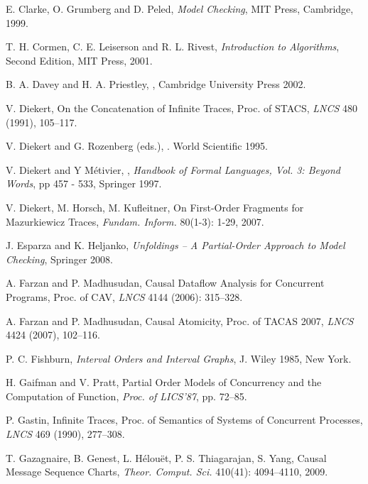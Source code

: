\documentclass{llncs}
\begin{document}
\begin{thebibliography}{19}




E. Clarke, O. Grumberg and D. Peled,  {\em Model Checking}, MIT Press, Cambridge, 1999.

T. H. Cormen, C. E. Leiserson and R. L. Rivest, \emph{Introduction
to Algorithms}, Second Edition, MIT Press, 2001.



B. A. Davey and H. A. Priestley, , \newblock Cambridge University Press 2002.





V. Diekert, On the Concatenation of Infinite Traces, Proc. of STACS, \emph{LNCS} 480 (1991), 105--117.


V. Diekert and G. Rozenberg (eds.),
.
\newblock World Scientific 1995.

V. Diekert and Y M\'etivier,
, {\em Handbook of Formal Languages, Vol. 3: Beyond Words},  pp 457 - 533, Springer 1997. 

V. Diekert, M. Horsch, M. Kufleitner, On First-Order Fragments for Mazurkiewicz Traces, \emph{Fundam. Inform.} 80(1-3): 1-29, 2007.


J. Esparza and K. Heljanko,
\emph{Unfoldings -- A Partial-Order Approach to Model Checking},
Springer 2008. 

A. Farzan and  P. Madhusudan,   Causal Dataflow Analysis for Concurrent Programs,  Proc. of  CAV, {\em LNCS} 4144 (2006): 315--328.

A. Farzan and P. Madhusudan,   Causal Atomicity,  Proc. of TACAS 2007, {\em LNCS} 4424 (2007),  102--116.


P. C. Fishburn, {\em Interval Orders and Interval Graphs},
J. Wiley 1985, New York.

H. Gaifman and V. Pratt, Partial Order Models of Concurrency and the Computation of Function,
{\em Proc. of LICS'87}, pp. 72--85.

P. Gastin, Infinite Traces, Proc. of Semantics of Systems of Concurrent Processes, \emph{LNCS}  469 (1990), 277--308.



T. Gazagnaire, B. Genest, L. H\'elou\"et, P. S. Thiagarajan, S. Yang, Causal Message Sequence Charts, \emph{Theor. Comput. Sci.} 410(41): 4094--4110, 2009.








\end{thebibliography}
\end{document}
